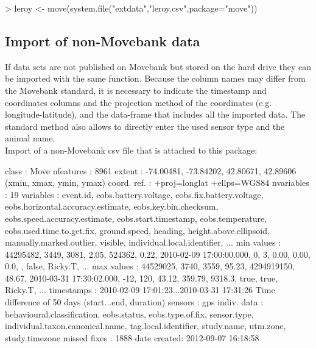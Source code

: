 \documentclass[article,nojss]{jss}
\newcommand{\fct}[1]{{\code{#1()}}}
\begin{document}
\begin{Schunk}
\begin{Sinput}
> leroy <- move(system.file("extdata","leroy.csv",package="move"))
\end{Sinput}
\end{Schunk}

\subsection{Import of non-Movebank data}
If data sets are not published on Movebank but stored on the hard drive they can be imported with the same \fct{move} function. Because the column names may differ from the Movebank standard, it is necessary to indicate the timestamp and coordinates columns and the projection method of the coordinates (e.g. longitude-latitude), and the data-frame that includes all the imported data. The standard \fct{move} method also allows to directly enter the used sensor type and the animal name. \\
Import of a non-Movebank csv file that is attached to this package:

\begin{Schunk}
\begin{Soutput}
class       : Move 
nfeatures   : 8961 
extent      : -74.00481, -73.84202, 42.80671, 42.89606  (xmin, xmax, ymin, ymax)
coord. ref. : +proj=longlat +ellps=WGS84 
nvariables  : 19
variables   : event.id, eobs.battery.voltage, eobs.fix.battery.voltage, eobs.horizontal.accuracy.estimate, eobs.key.bin.checksum, eobs.speed.accuracy.estimate, eobs.start.timestamp, eobs.temperature, eobs.used.time.to.get.fix, ground.speed, heading, height.above.ellipsoid, manually.marked.outlier, visible, individual.local.identifier, ... 
min values  : 44295482, 3449, 3081,  2.05,     524362,  0.22, 2010-02-09 17:00:00.000,   0,   3,  0.00,   0.00,    0.0, , false, Ricky.T, ... 
max values  : 44529025, 3740, 3559, 95.23, 4294919150, 48.67, 2010-03-31 17:30:02.000, -12, 120, 43.12, 359.79, 9318.3, true, true, Ricky.T, ... 
timestamps  : 2010-02-09 17:01:23...2010-03-31 17:31:26 Time difference of 50 days  (start...end, duration) 
sensors     : gps 
indiv. data : behavioural.classification, eobs.status, eobs.type.of.fix, sensor.type, individual.taxon.canonical.name, tag.local.identifier, study.name, utm.zone, study.timezone 
missed fixes : 1888 
date created: 2012-09-07 16:18:58 
\end{Soutput}
\end{Schunk}
\end{document}
